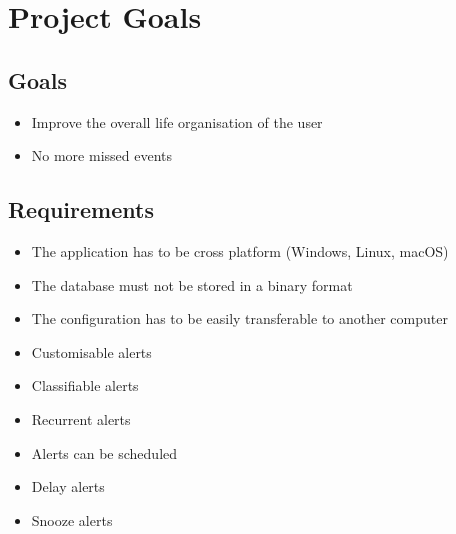 \chapter{Project Goals}
\section{Goals}
\begin{itemize}
\item Improve the overall life organisation of the user
\item No more missed events
\end{itemize}
\section{Requirements}
\begin{itemize}
\item The application has to be cross platform (Windows, Linux, macOS)
\item The database must not be stored in a binary format
\item The configuration has to be easily transferable to another computer
\item Customisable alerts
\item Classifiable alerts
\item Recurrent alerts
\item Alerts can be scheduled
\item Delay alerts
\item Snooze alerts
\end{itemize}